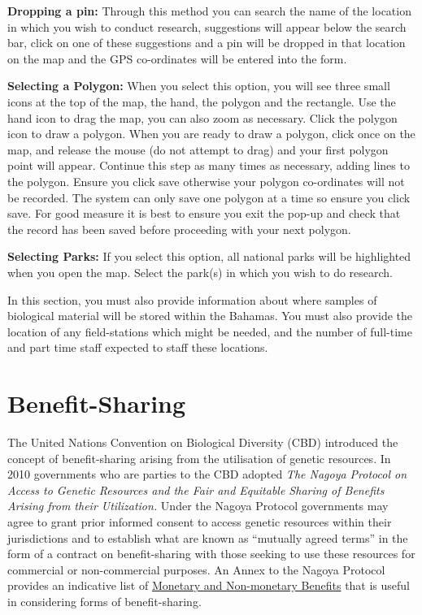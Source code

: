 \documentclass[
]{book}
\begin{document}
\textbf{Dropping a pin:} Through this method you can search the name of the location in which you wish to conduct research, suggestions will appear below the search bar, click on one of these suggestions and a pin will be dropped in that location on the map and the GPS co-ordinates will be entered into the form.

\textbf{Selecting a Polygon:} When you select this option, you will see three small icons at the top of the map, the hand, the polygon and the rectangle. Use the hand icon to drag the map, you can also zoom as necessary. Click the polygon icon to draw a polygon. When you are ready to draw a polygon, click once on the map, and release the mouse (do not attempt to drag) and your first polygon point will appear. Continue this step as many times as necessary, adding lines to the polygon. Ensure you click save otherwise your polygon co-ordinates will not be recorded. The system can only save one polygon at a time so ensure you click save. For good measure it is best to ensure you exit the pop-up and check that the record has been saved before proceeding with your next polygon.

\textbf{Selecting Parks:} If you select this option, all national parks will be highlighted when you open the map. Select the park(s) in which you wish to do research.

In this section, you must also provide information about where samples of biological material will be stored within the Bahamas. You must also provide the location of any field-stations which might be needed, and the number of full-time and part time staff expected to staff these locations.

\hypertarget{benefit-sharing}{%
\chapter{Benefit-Sharing}\label{benefit-sharing}}

The United Nations Convention on Biological Diversity (CBD) introduced the concept of benefit-sharing arising from the utilisation of genetic resources. In 2010 governments who are parties to the CBD adopted \emph{The Nagoya Protocol on Access to Genetic Resources and the Fair and Equitable Sharing of Benefits Arising from their Utilization.} Under the Nagoya Protocol governments may agree to grant prior informed consent to access genetic resources within their jurisdictions and to establish what are known as ``mutually agreed terms'' in the form of a contract on benefit-sharing with those seeking to use these resources for commercial or non-commercial purposes. An Annex to the Nagoya Protocol provides an indicative list of \href{https://www.cbd.int/abs/text/articles/?sec=abs-37}{Monetary and Non-monetary Benefits} that is useful in considering forms of benefit-sharing.
\end{document}
